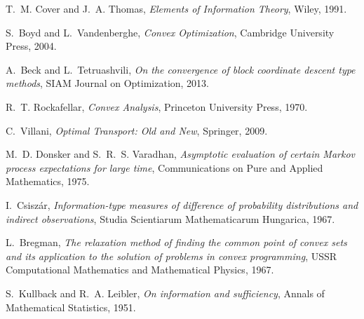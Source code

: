 \documentclass[11pt,a4paper]{article}
\theoremstyle{remark}
\begin{document}
\begin{thebibliography}{9}

T.~M. Cover and J.~A. Thomas, \emph{Elements of Information Theory}, Wiley, 1991.

S.~Boyd and L.~Vandenberghe, \emph{Convex Optimization}, Cambridge University Press, 2004.

A.~Beck and L.~Tetruashvili, \emph{On the convergence of block coordinate descent type methods}, SIAM Journal on Optimization, 2013.

R.~T. Rockafellar, \emph{Convex Analysis}, Princeton University Press, 1970.

C.~Villani, \emph{Optimal Transport: Old and New}, Springer, 2009.

M.~D. Donsker and S.~R.~S. Varadhan, \emph{Asymptotic evaluation of certain Markov process expectations for large time}, Communications on Pure and Applied Mathematics, 1975.

I.~Csisz\'ar, \emph{Information-type measures of difference of probability distributions and indirect observations}, Studia Scientiarum Mathematicarum Hungarica, 1967.

L.~Bregman, \emph{The relaxation method of finding the common point of convex sets and its application to the solution of problems in convex programming}, USSR Computational Mathematics and Mathematical Physics, 1967.

S.~Kullback and R.~A. Leibler, \emph{On information and sufficiency}, Annals of Mathematical Statistics, 1951.

\end{thebibliography}
\end{document}
